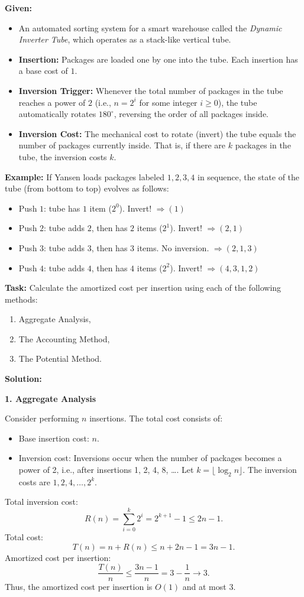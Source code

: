 \problem{}
\textbf{Given:}
\begin{itemize}
    \item An automated sorting system for a smart warehouse called the \emph{Dynamic Inverter Tube}, which operates as a stack-like vertical tube.
    \item \textbf{Insertion:} Packages are loaded one by one into the tube. Each insertion has a base cost of $1$.
    \item \textbf{Inversion Trigger:} Whenever the total number of packages in the tube reaches a power of $2$ (i.e., $n = 2^i$ for some integer $i \ge 0$), the tube automatically rotates $180^\circ$, reversing the order of all packages inside.
    \item \textbf{Inversion Cost:} The mechanical cost to rotate (invert) the tube equals the number of packages currently inside. That is, if there are $k$ packages in the tube, the inversion costs $k$.
\end{itemize}

\noindent \textbf{Example:}
If Yansen loads packages labeled $1,2,3,4$ in sequence, the state of the tube (from bottom to top) evolves as follows:
\begin{itemize}
    \item Push $1$: tube has $1$ item ($2^0$). Invert! $\Rightarrow (1)$
    \item Push $2$: tube adds $2$, then has $2$ items ($2^1$). Invert! $\Rightarrow (2,1)$
    \item Push $3$: tube adds $3$, then has $3$ items. No inversion. $\Rightarrow (2,1,3)$
    \item Push $4$: tube adds $4$, then has $4$ items ($2^2$). Invert! $\Rightarrow (4,3,1,2)$
\end{itemize}

\noindent \textbf{Task:}
Calculate the amortized cost per insertion using each of the following methods:
\begin{enumerate}
    \item Aggregate Analysis,
    \item The Accounting Method,
    \item The Potential Method.
\end{enumerate}

\textbf{Solution:}


\textbf{1. Aggregate Analysis}

Consider performing \(n\) insertions. The total cost consists of:
\begin{itemize}
    \item Base insertion cost: \(n\).
    \item Inversion cost: Inversions occur when the number of packages becomes a power of 2, i.e., after insertions 1, 2, 4, 8, \dots. Let \(k = \lfloor \log_2 n \rfloor\). The inversion costs are \(1, 2, 4, \dots, 2^k\).
\end{itemize}
Total inversion cost:
\[
R(n) = \sum_{i=0}^{k} 2^i = 2^{k+1} - 1 \leq 2n - 1.
\]
Total cost:
\[
T(n) = n + R(n) \leq n + 2n - 1 = 3n - 1.
\]
Amortized cost per insertion:
\[
\frac{T(n)}{n} \leq \frac{3n-1}{n} = 3 - \frac{1}{n} \to 3.
\]
Thus, the amortized cost per insertion is \(O(1)\) and at most 3.


